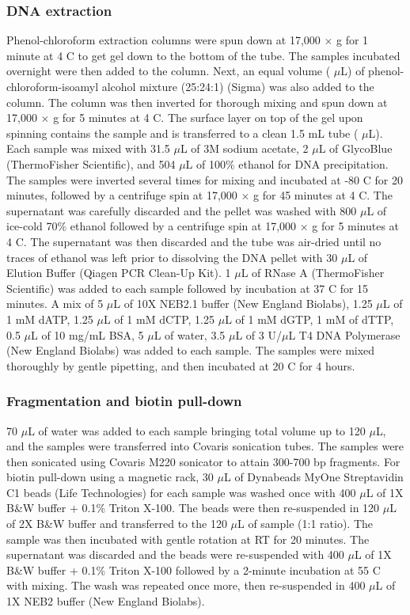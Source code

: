 \subsubsection{DNA extraction}

Phenol-chloroform extraction columns were spun down at 17,000 $\times$ g for 1 minute at 4 \textdegree C to get gel down to the bottom of the tube.
The samples incubated overnight were then added to the column.
Next, an equal volume ( $\mu$L) of phenol-chloroform-isoamyl alcohol mixture (25:24:1) (Sigma) was also added to the column.
The column was then inverted for thorough mixing and spun down at 17,000 $\times$ g for 5 minutes at 4 \textdegree C.
The surface layer on top of the gel upon spinning contains the sample and is transferred to a clean 1.5 mL tube ( $\mu$L).
Each sample was mixed with 31.5 $\mu$L of 3M sodium acetate, 2 $\mu$L of GlycoBlue (ThermoFisher Scientific), and 504 $\mu$L of 100\% ethanol for DNA precipitation.
The samples were inverted several times for mixing and incubated at -80 \textdegree C for 20 minutes, followed by a centrifuge spin at 17,000 $\times$ g for 45 minutes at 4 \textdegree C.
The supernatant was carefully discarded and the pellet was washed with 800 $\mu$L of ice-cold 70\% ethanol followed by a centrifuge spin at 17,000 $\times$ g for 5 minutes at 4 \textdegree C.
The supernatant was then discarded and the tube was air-dried until no traces of ethanol was left prior to dissolving the DNA pellet with 30 $\mu$L of Elution Buffer (Qiagen PCR Clean-Up Kit).
1 $\mu$L of RNase A (ThermoFisher Scientific) was added to each sample followed by incubation at 37 \textdegree C for 15 minutes.
A mix of 5 $\mu$L of 10X NEB2.1 buffer (New England Biolabs), 1.25 $\mu$L of 1 mM dATP, 1.25 $\mu$L of 1 mM dCTP, 1.25 $\mu$L of 1 mM dGTP, 1 mM of dTTP, 0.5 $\mu$L of 10 mg/mL BSA, 5 $\mu$L of water, 3.5 $\mu$L of 3 U/$\mu$L T4 DNA Polymerase (New England Biolabs) was added to each sample.
The samples were mixed thoroughly by gentle pipetting, and then incubated at 20 \textdegree C for 4 hours.

\subsubsection{Fragmentation and biotin pull-down}

70 $\mu$L of water was added to each sample bringing total volume up to 120 $\mu$L, and the samples were transferred into Covaris sonication tubes.
The samples were then sonicated using Covaris M220 sonicator to attain 300-700 bp fragments.
For biotin pull-down using a magnetic rack, 30 $\mu$L of Dynabeads MyOne Streptavidin C1 beads (Life Technologies) for each sample was washed once with 400 $\mu$L of 1X B\&W buffer + 0.1\% Triton X-100.
The beads were then re-suspended in 120 $\mu$L of 2X B\&W buffer and transferred to the 120 $\mu$L of sample (1:1 ratio).
The sample was then incubated with gentle rotation at RT for 20 minutes.
The supernatant was discarded and the beads were re-suspended with 400 $\mu$L of 1X B\&W buffer + 0.1\% Triton X-100 followed by a 2-minute incubation at 55 \textdegree C with mixing.
The wash was repeated once more, then re-suspended in 400 $\mu$L of 1X NEB2 buffer (New England Biolabs).

